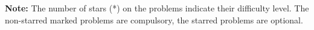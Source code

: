 \noindent \textbf{Note:} The number of stars (*) on the problems indicate their difficulty level. The non-starred marked problems are compulsory, the starred problems are optional.

%

